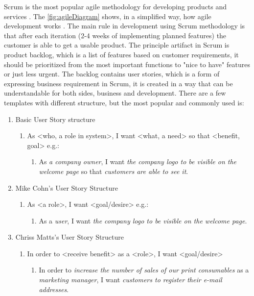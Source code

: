 Scrum is the most popular agile methodology for developing products and services \cite{ArticleStateOfAgile}. The \autoref{fig:agileDiagram} shows, in a simplified way, how agile development works \cite{ScrumBook}. The main rule in development using Scrum methodology is that after each iteration (2-4 weeks of implementing planned features) the customer is able to get a usable product. The principle artifact in Scrum is product backlog, which is a list of features based on customer requirements, it should be prioritized from the most important functions to "nice to have" features or just less urgent. The backlog contains user stories, which is a form of expressing business requirement in Scrum, it is created in a way that can be understandable for both sides, business and development. There are a few templates with different structure, but the most popular and commonly used is:

\begin{enumerate}
    \item Basic User Story structure \cite{ScrumBook}
    \begin{enumerate}
        \item As <who, a role in system>, I want <what, a need> so that <benefit, goal> e.g.:
            \begin{enumerate}
                \item As \textit{a company owner}, I want \textit{the company logo to be visible on the welcome page} so that \textit{customers are able to see it}.
            \end{enumerate}
    \end{enumerate}
    \item Mike Cohn's User Story Structure \cite{MikeCohnUS}
    \begin{enumerate}
        \item As <a role>, I want <goal/desire> e.g.:
        \begin{enumerate}
            \item As a \textit{user}, I want \textit{the company logo to be visible on the welcome page}.
        \end{enumerate}
    \end{enumerate}
    \item Chriss Matts's User Story Structure \cite{AntonyMarcanoUS}
    \begin{enumerate}
        \item In order to <receive benefit> as a <role>, I want <goal/desire>
        \begin{enumerate}
            \item In order to \textit{increase the number of sales of our print consumables} as a \textit{marketing manager}, I want \textit{customers to register their e-mail addresses}.
        \end{enumerate}
    \end{enumerate}
\end{enumerate}

